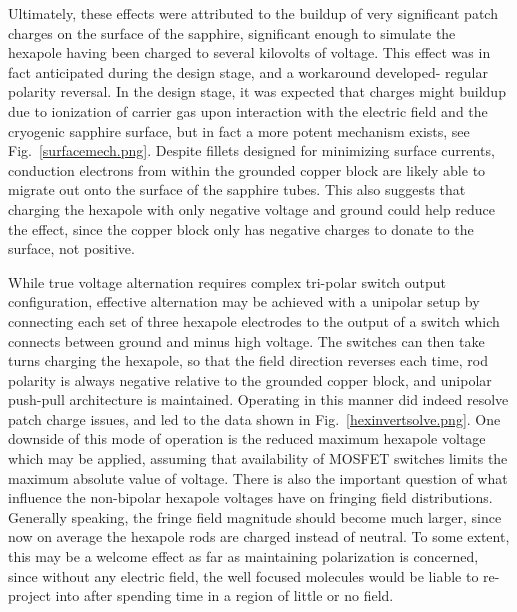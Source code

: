 Ultimately, these effects were attributed to the buildup of very significant patch charges on the surface of the sapphire, significant enough to simulate the hexapole having been charged to several kilovolts of voltage.
This effect was in fact anticipated during the design stage, and a workaround developed- regular polarity reversal.
In the design stage, it was expected that charges might buildup due to ionization of carrier gas upon interaction with the electric field and the cryogenic sapphire surface, but in fact a more potent mechanism exists, see Fig.~\ref{surfacemech.png}.
Despite fillets designed for minimizing surface currents, conduction electrons from within the grounded copper block are likely able to migrate out onto the surface of the sapphire tubes.
This also suggests that charging the hexapole with only negative voltage and ground could help reduce the effect, since the copper block only has negative charges to donate to the surface, not positive.


While true voltage alternation requires complex tri-polar switch output configuration, effective alternation may be achieved with a unipolar setup by connecting each set of three hexapole electrodes to the output of a switch which connects between ground and minus high voltage.
The switches can then take turns charging the hexapole, so that the field direction reverses each time, rod polarity is always negative relative to the grounded copper block, and unipolar push-pull architecture is maintained.
Operating in this manner did indeed resolve patch charge issues, and led to the data shown in Fig.~\ref{hexinvertsolve.png}.
One downside of this mode of operation is the reduced maximum hexapole voltage which may be applied, assuming that availability of MOSFET switches limits the maximum absolute value of voltage.
There is also the important question of what influence the non-bipolar hexapole voltages have on fringing field distributions.
Generally speaking, the fringe field magnitude should become much larger, since now on average the hexapole rods are charged instead of neutral.
To some extent, this may be a welcome effect as far as maintaining polarization is concerned, since without any electric field, the well focused  molecules would be liable to re-project into  after spending time in a region of little or no field.


